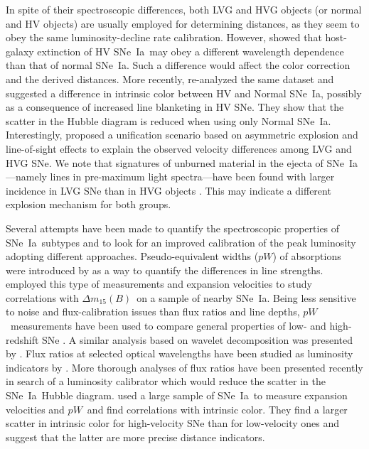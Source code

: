 \documentclass[apj]{emulateapj-rtx4}
\newcommand{\ew}{$pW$}
\newcommand{\dm}{$\Delta m_{15}(B)$}
\newcommand{\sneia}{SNe~Ia}
\begin{document}
In spite of their spectroscopic differences, both LVG and HVG objects
(or normal and HV objects) are usually employed for determining
distances, as they seem to obey the same luminosity-decline rate
calibration. However, \citet{wang09} showed that host-galaxy 
extinction of HV \sneia\ may obey a different wavelength dependence than
that of normal \sneia. Such a difference would affect the color
correction and the derived distances. More recently, \citet{foley11a}
re-analyzed the same dataset and suggested a difference in intrinsic
color between HV and Normal \sneia, possibly as a consequence of
increased line blanketing in HV SNe. They show that the scatter in the
Hubble diagram is reduced when using only Normal
\sneia. Interestingly, \citet{maeda10b} proposed a unification
scenario based on asymmetric explosion and 
line-of-sight effects to explain the observed velocity differences
among LVG and HVG SNe. We note that signatures of unburned material in
the ejecta of \sneia---namely  lines in pre-maximum light
spectra---have been found with larger incidence in LVG SNe than in HVG
objects \citep{parrent11,thomas11b,folatelli12,silverman12d}. This may
indicate a different explosion mechanism for both groups.

Several attempts have been made to quantify the spectroscopic properties of
\sneia\ subtypes and to look for an improved calibration of the peak
luminosity adopting different
approaches. Pseudo-equivalent widths (\ew) of absorptions were
introduced by \citet{folatelli04} as a way to quantify the differences
in line strengths. \citet{hachinger06} employed this type of
measurements and expansion velocities to study correlations with
\dm\ on a sample of nearby \sneia. Being less sensitive to noise and
flux-calibration issues than flux ratios and line depths,
\ew\ measurements have been 
used to compare general properties of low- and high-redshift SNe
\citep{garavini07,arsenijevic08,bronder08,walker11}. A similar
analysis based on wavelet decomposition was presented by
\citet{wagers10}. Flux ratios at 
selected optical wavelengths have been studied as luminosity
indicators by \citet{bongard06}. More thorough analyses of flux ratios
have been presented recently \citep{bailey09,blondin11a} in
search of a luminosity calibrator which would reduce the scatter
in the \sneia\ Hubble diagram. \citet{foley11b} used a large sample of
\sneia\ to measure expansion velocities and \ew\ and find correlations
with intrinsic color. They find a larger scatter in intrinsic color
for high-velocity SNe than for low-velocity ones and suggest that the
latter are more precise distance indicators.
\end{document}
